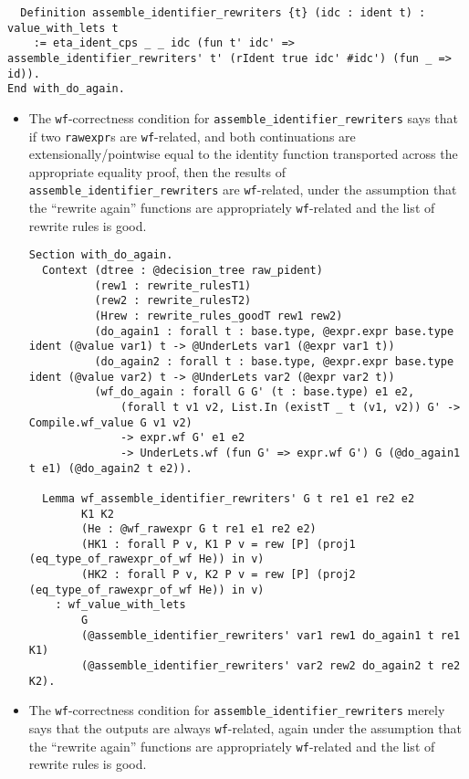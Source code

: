 \documentclass[
]{article}
\begin{document}
\begin{itemize}
\begin{itemize}
\begin{verbatim}
  Definition assemble_identifier_rewriters {t} (idc : ident t) : value_with_lets t
    := eta_ident_cps _ _ idc (fun t' idc' => assemble_identifier_rewriters' t' (rIdent true idc' #idc') (fun _ => id)).
End with_do_again.
\end{verbatim}

    \begin{itemize}
    \item
      The \texttt{wf}-correctness condition for
      \texttt{assemble\_identifier\_rewriters\textquotesingle{}} says
      that if two \texttt{rawexpr}s are \texttt{wf}-related, and both
      continuations are extensionally/pointwise equal to the identity
      function transported across the appropriate equality proof, then
      the results of
      \texttt{assemble\_identifier\_rewriters\textquotesingle{}} are
      \texttt{wf}-related, under the assumption that the ``rewrite
      again'' functions are appropriately \texttt{wf}-related and the
      list of rewrite rules is good.

\begin{verbatim}
Section with_do_again.
  Context (dtree : @decision_tree raw_pident)
          (rew1 : rewrite_rulesT1)
          (rew2 : rewrite_rulesT2)
          (Hrew : rewrite_rules_goodT rew1 rew2)
          (do_again1 : forall t : base.type, @expr.expr base.type ident (@value var1) t -> @UnderLets var1 (@expr var1 t))
          (do_again2 : forall t : base.type, @expr.expr base.type ident (@value var2) t -> @UnderLets var2 (@expr var2 t))
          (wf_do_again : forall G G' (t : base.type) e1 e2,
              (forall t v1 v2, List.In (existT _ t (v1, v2)) G' -> Compile.wf_value G v1 v2)
              -> expr.wf G' e1 e2
              -> UnderLets.wf (fun G' => expr.wf G') G (@do_again1 t e1) (@do_again2 t e2)).

  Lemma wf_assemble_identifier_rewriters' G t re1 e1 re2 e2
        K1 K2
        (He : @wf_rawexpr G t re1 e1 re2 e2)
        (HK1 : forall P v, K1 P v = rew [P] (proj1 (eq_type_of_rawexpr_of_wf He)) in v)
        (HK2 : forall P v, K2 P v = rew [P] (proj2 (eq_type_of_rawexpr_of_wf He)) in v)
    : wf_value_with_lets
        G
        (@assemble_identifier_rewriters' var1 rew1 do_again1 t re1 K1)
        (@assemble_identifier_rewriters' var2 rew2 do_again2 t re2 K2).
\end{verbatim}
    \item
      The \texttt{wf}-correctness condition for
      \texttt{assemble\_identifier\_rewriters} merely says that the
      outputs are always \texttt{wf}-related, again under the assumption
      that the ``rewrite again'' functions are appropriately
      \texttt{wf}-related and the list of rewrite rules is good.


\end{itemize}
\end{itemize}
\end{itemize}
\end{document}
